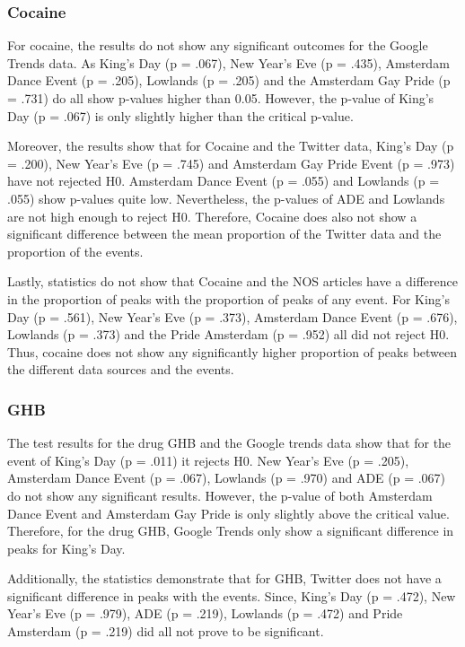 \subsubsection{Cocaine}

For cocaine, the results do not show any significant outcomes for the Google Trends data. As King’s Day (p = .067), New Year’s Eve (p = .435), Amsterdam Dance Event (p = .205), Lowlands (p = .205) and the Amsterdam Gay Pride (p = .731) do all show p-values higher than 0.05. However, the p-value of King’s Day (p = .067) is only slightly higher than the critical p-value. 

	Moreover, the results show that for Cocaine and the Twitter data, King’s Day (p = .200), New Year’s Eve (p = .745) and Amsterdam Gay Pride Event (p = .973) have not rejected H0.  Amsterdam Dance Event (p = .055) and Lowlands (p = .055) show p-values quite low. Nevertheless, the p-values of ADE and Lowlands are not high enough to reject H0. Therefore, Cocaine does also not show a significant difference between the mean proportion of the Twitter data and the proportion of the events. 

	Lastly, statistics do not show that Cocaine and the NOS articles have a difference in the proportion of peaks with the proportion of peaks of any event. For King’s Day (p = .561), New Year’s Eve (p = .373), Amsterdam Dance Event (p = .676), Lowlands (p = .373) and the Pride Amsterdam (p = .952) all did not reject H0. Thus, cocaine does not show any significantly higher proportion of peaks between the different data sources and the events.

\subsubsection{GHB}

The test results for the drug GHB and the Google trends data show that for the event of King’s Day (p = .011) it rejects H0. New Year’s Eve (p = .205), Amsterdam Dance Event (p = .067), Lowlands (p = .970) and ADE (p = .067) do not show any significant results. However, the p-value of both Amsterdam Dance Event and Amsterdam Gay Pride is only slightly above the critical value. Therefore, for the drug GHB, Google Trends only show a significant difference in peaks for King’s Day.

Additionally, the statistics demonstrate that for GHB, Twitter does not have a significant difference in peaks with the events. Since, King’s Day (p = .472), New Year’s Eve (p = .979), ADE (p = .219), Lowlands (p = .472) and Pride Amsterdam (p = .219) did all not prove to be significant.

